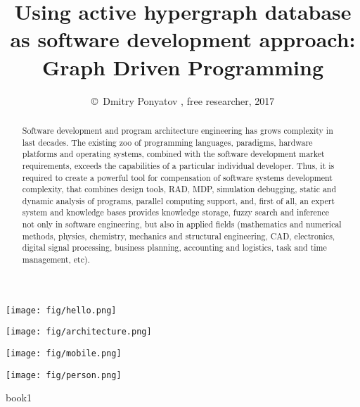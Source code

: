 

\title{
Using active hypergraph database\\
as software development approach:\\
\Huge{Graph Driven Programming}}

\author{\small{\copyright\ Dmitry Ponyatov , free researcher, 2017}}


\maketitle
\tableofcontents

\begin{abstract}\noindent
Software development and program architecture engineering has grows complexity in last decades. The existing zoo of programming languages, para\-digms, hardware platforms and operating systems, combined with the software development market requirements, exceeds the capabilities of a particular individual developer. Thus, it is required to create a powerful tool for compensation of software systems development complexity, that combines design tools, RAD, MDP, simulation debugging, static and dynamic analysis of programs, parallel computing support, and, first of all, an expert system and knowledge bases provides knowledge storage, fuzzy search and inference not only in software engineering, but also in applied fields (mathematics and numerical methods, physics, chemistry, mechanics and structural engineering, CAD, electronics, digital signal processing, business planning, accounting and logistics, task and time management, etc).
\end{abstract}



\noindent\texttt{[image: fig/hello.png]}

\noindent\texttt{[image: fig/architecture.png]}

\noindent\texttt{[image: fig/mobile.png]}

\noindent\texttt{[image: fig/person.png]}

\begin{thebibliography}{99}
 book1
\end{thebibliography}



